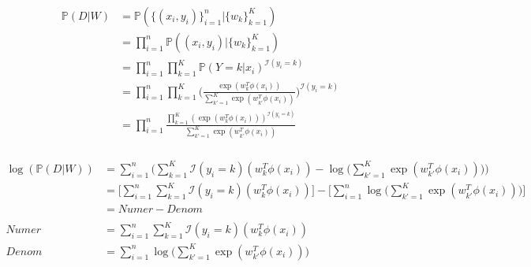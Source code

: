 \documentclass[12pt, fleqn]{article}
\begin{document}
\subsubsection{}
\begin{equation*}
  \begin{aligned}
    \mathbb{P}(D|W) & = \mathbb{P}(\{(x_i, y_i)\}_{i=1}^n | \{w_k\}_{k=1}^K)                                                                                    \\
                    & = \prod_{i=1}^n \mathbb{P}((x_i, y_i) | \{w_k\}_{k=1}^K)                                                                                  \\
                    & = \prod_{i=1}^n \prod_{k=1}^K \mathbb{P}(Y = k | x_i)^{\mathcal{I}(y_i = k)}                                                              \\
                    & = \prod_{i=1}^n \prod_{k=1}^K \bigg( \frac{\exp (w_k^T \phi(x_i))}{\sum_{k'=1}^K \exp (w_{k'}^T \phi(x_i))} \bigg)^{\mathcal{I}(y_i = k)} \\
                    & = \prod_{i=1}^n \frac{\prod_{k=1}^K (\exp (w_k^T \phi(x_i)))^{\mathcal{I}(y_i = k)}}{\sum_{k'=1}^K \exp (w_{k'}^T \phi(x_i))}
  \end{aligned}
\end{equation*}

\subsubsection{}
\begin{equation*}
  \begin{aligned}
    \log (\mathbb{P}(D|W)) & = \sum_{i=1}^n \bigg( \sum_{k=1}^K \mathcal{I}(y_i = k) (w_k^T \phi(x_i)) - \log \bigg( \sum_{k'=1}^K \exp (w_{k'}^T \phi(x_i)) \bigg) \bigg)                            \\
                           & = \bigg[ \sum_{i=1}^n \sum_{k=1}^K \mathcal{I}(y_i = k) (w_k^T \phi(x_i)) \bigg] - \bigg[ \sum_{i=1}^n \log \bigg( \sum_{k'=1}^K \exp (w_{k'}^T \phi(x_i)) \bigg) \bigg] \\
                           & = Numer - Denom                                                                                                                                                          \\
    \\
    Numer                  & = \sum_{i=1}^n \sum_{k=1}^K \mathcal{I}(y_i = k) (w_k^T \phi(x_i))                                                                                                       \\
    Denom                  & = \sum_{i=1}^n \log \bigg( \sum_{k'=1}^K \exp (w_{k'}^T \phi(x_i)) \bigg)
  \end{aligned}
\end{equation*}
\end{document}
